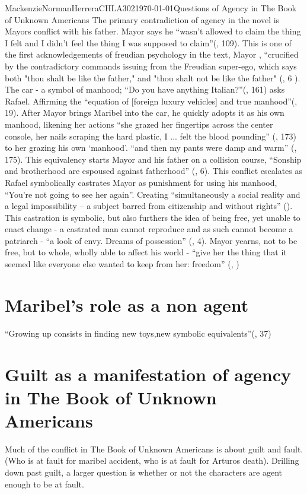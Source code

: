 \documentclass{article}
\begin{document}
\begin{mla}{Mackenzie}{Norman}{Herrera}{CHLA302}{\today}{Questions of Agency in The Book of Unknown Americans}
The primary contradiction of agency in the novel is Mayors conflict with his father. Mayor says he ``wasn’t allowed to claim the thing I felt and I didn’t feel the thing I was supposed to claim''(\cite{Henriquez2014-sh}, 109). This is one of the first acknowledgements of freudian psychology in the text, 
Mayor , ``crucified by the contradictory commands issuing from the Freudian super-ego, which says both "thou shalt be like the father," and "thou shalt not be like the father" (\cite{loves-bdy}, 6 ). The car - a symbol of manhood; ``Do you have anything Italian?''(\cite{Henriquez2014-sh}, 161) asks Rafael. Affirming the ``equation of [foreign luxury vehicles] and true manhood''(\cite{Uhlman2015-qx}, 19). After Mayor brings Maribel into the car, he quickly adopts it as his own manhood, likening her actions ``she grazed her fingertips across the center console, her nails scraping the hard plastic, I ... felt the blood pounding'' (\cite{Henriquez2014-sh}, 173) to her grazing his own `manhood'. ``and then my pants were damp and warm'' (\cite{Henriquez2014-sh}, 175). This equivalency starts Mayor and his father on a collision course, ``Sonship and brotherhood are espoused against fatherhood'' (\cite{loves-bdy}, 6). This conflict escalates as Rafael symbolically castrates Mayor as punishment for using his manhood, ``You're not going to see her again''. Creating  ``simultaneously a social reality and a legal impossibility – a subject barred from citizenship and without rights'' (\cite{Lutes_Travis_2021}). This castration is symbolic, but also furthers the idea of being free, yet unable to enact change - a castrated man cannot reproduce and as such cannot become a patriarch - ``a look of envy. Dreams of possession'' (\cite{wretched}, 4). Mayor yearns, not to be free, but to whole, wholly able to affect his world - ``give her the thing that it seemed like everyone else wanted to keep from her: freedom'' (\cite{Henriquez2014-sh}, )

\section*{Maribel’s role as a non agent}


``Growing up consists in finding new toys,new symbolic equivalents''(\cite{loves-bdy}, 37)


\section*{Guilt as a manifestation of agency in The Book of Unknown Americans}
Much of the conflict in The Book of Unknown Americans is about guilt and fault. (Who is at fault for maribel accident, who is at fault for Arturos death). Drilling down past guilt, a larger question is whether or not the characters are agent enough to be at fault. 

\end{mla}
\end{document}
